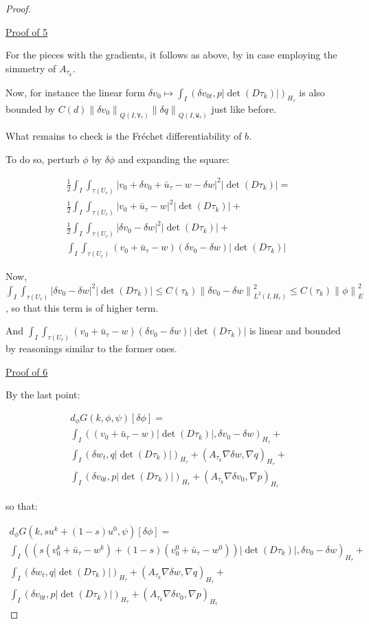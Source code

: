 \documentclass[english,a4paper,9pt,oneside]{scrbook}	%
\theoremstyle{break}
\newenvironment{mproof}[1][\proofname]{%
  \begin{proof}[#1]$ $\par\nobreak\ignorespaces
}{%
  \end{proof}
}
\renewcommand*{\proofname}{Proof}
\theoremstyle{remark}
\newcommand{\ds}{\displaystyle}
\newcommand{\norm}[1]{\left\lVert#1\right\rVert}
\newcommand{\tw}[1]{\texttt{#1}}
\begin{document}
\begin{mproof}
\underline{Proof of 5}

For the pieces with the gradients, it follows as above, by in case employing the simmetry of $A_{\tau_k}$.

Now, for instance the linear form $\delta v_0 \mapsto \int_I (\delta v_{0t},p |\det(D\tau_k)|)_{H_\tau}$ is also bounded by $C(d) \norm{\delta v_0}_{Q(I,\tw{V}_\tau)}\norm{\delta q}_{Q(I,\tw{W}_\tau)}$ just like before.

What remains to check is the Fréchet differentiability of $b$.

To do so, perturb $\phi$ by $\delta \phi$ and expanding the square:

\begin{align*}
\frac{1}{2}\int_I \int_{\tau(U_r)}|v_0+\delta v_0+\bar{u}_\tau - w-\delta w|^2|\det(D\tau_k)| = \\\frac{1}{2}\int_I \int_{\tau(U_r)}|v_0+\bar{u}_\tau - w|^2|\det(D\tau_k)|+\\\frac{1}{2}\int_I \int_{\tau(U_r)}|\delta v_0-\delta w|^2|\det(D\tau_k)|+\\\int_I \int_{\tau(U_r)}(v_0+\bar{u}_\tau - w)(\delta v_0-\delta w)|\det(D\tau_k)|
\end{align*} 

Now, $\ds \int_I \int_{\tau(U_r)}|\delta v_0-\delta w|^2|\det(D\tau_k)|\leq C(\tau_k)\norm{\delta v_0-\delta w}_{L^2(I,H_\tau)}^2\leq C(\tau_k)\norm{\phi}_E^2$, so that this term is of higher term.

And $\ds \int_I \int_{\tau(U_r)}(v_0+\bar{u}_\tau - w)(\delta v_0-\delta w)|\det(D\tau_k)|$ is linear and bounded by reasonings similar to the former ones.

\underline{Proof of 6}

By the last point:

\begin{align*}
d_\phi G(k, \phi ,\psi)[\delta \phi] =\\
\int_I ((v_0+\bar{u}_\tau - w)|\det(D\tau_k)|,\delta v_0-\delta w)_{H_\tau}+\\
\int_I (\delta w_t , q |\det(D\tau_k)|)_{H_\tau}+ (A_{\tau_k}\nabla \delta w, \nabla q)_{H_\tau}+\\
\int_I (\delta v_{0t},p |\det(D\tau_k)|)_{H_\tau} + (A_{\tau_k} \nabla \delta v_0, \nabla p)_{H_\tau}
\end{align*}

so that:

\begin{align*}
d_\phi G(k, su^k + (1-s)u^0,\psi)[\delta \phi] = \\
\int_I ((s(v_0^k+\bar{u}_\tau - w^k)+(1-s)(v_0^0+\bar{u}_\tau - w^0))|\det(D\tau_k)|,\delta v_0-\delta w)_{H_\tau}+\\
\int_I ( \delta w_t , q |\det(D\tau_k)|)_{H_\tau}+ (A_{\tau_k}\nabla \delta w, \nabla q)_{H_\tau}+\\
\int_I ( \delta v_{0t},p |\det(D\tau_k)|)_{H_\tau} + (A_{\tau_k} \nabla \delta v_0, \nabla p)_{H_\tau}
\end{align*}


\end{mproof}
\end{document}
